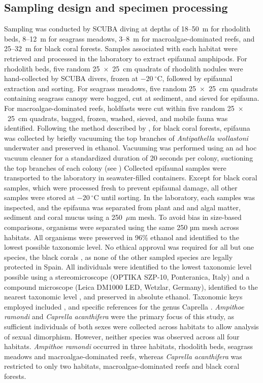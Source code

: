 \documentclass[journal,article,submit,pdftex,moreauthors]{Definitions/mdpi}
\begin{document}
    		\subsection{Sampling design and specimen processing}
    	Sampling was conducted by SCUBA diving at depths of 18–50~m for rhodolith beds, 8–12~m for seagrass meadows, 3–8~m for macroalgae-dominated reefs, and 25–32~m for black coral forests. Samples associated with each habitat were retrieved and processed in the laboratory to extract epifaunal amphipods. For rhodolith beds, five random 25~$\times$~25~cm quadrats of rhodolith nodules were hand-collected by SCUBA divers, frozen at $-20~^\circ$C, followed by epifaunal extraction and sorting. For seagrass meadows, five random 25~$\times$~25~cm  quadrats containing seagrass canopy were bagged, cut at sediment, and sieved for epifauna. For macroalgae-dominated reefs, holdfasts were cut within five random 25~$\times$~25~cm quadrats, bagged, frozen, washed, sieved, and mobile fauna was identified. Following the method described by \citep{navarro2024hidden}, for black coral forests, epifauna was collected by briefly vacuuming the top branches of \textit{Antipathella wollastoni} underwater and preserved in ethanol. Vacuuming was performed using an ad hoc vacuum cleaner for a standardized duration of 20 seconds per colony, suctioning the top branches of each colony (see \citet{navarro2024hidden}) Collected epifaunal samples were transported to the laboratory in seawater-filled containers. Except for black coral samples, which were processed fresh to prevent epifaunal damage, all other samples were stored at $-20~^\circ$C until sorting. In the laboratory, each samples was inspected, and the epifauna was separated from plant and and algal matter, sediment and coral mucus using a 250~$\mu$m mesh. To avoid bias in size-based comparisons, organisms were separated using the same 250 µm mesh across habitats. All organisms were preserved in 96\% ethanol and identified to the lowest possible taxonomic level. No ethical approval was required for all but one species, the black corals \citep{Wagner2012}, as none of the other sampled species are legally protected in Spain. All individuals were identified to the lowest taxonomic level possible using a stereomicroscope (OPTIKA SZP-10, Ponteranica, Italy) and a compound microscope (Leica DM1000 LED, Wetzlar, Germany), identified to the nearest taxonomic level \citep{bellan1982amphipoda, bellan1989amphipoda, bellan1993amphipoda}, and preserved in absolute ethanol. Taxonomic keys employed included \citet{ruffo1982family, ruffo1989amphipoda, bellan1993amphipoda, bellan1998amphipoda}, and specific references for the genus Caprella \citep{guerra2002caprellidea}. \textit{Ampithoe ramondi} and \textit{Caprella acanthifera} were the primary focus of this study, as sufficient individuals of both sexes were collected across habitats to allow analysis of sexual dimorphism. However, neither species was observed across all four habitats. \textit{Ampithoe ramondi} occurred in three habitats, rhodolith beds, seagrass meadows and macroalgae-dominated reefs, whereas \textit{Caprella acanthifera} was restricted to only two habitats, macroalgae-dominated reefs and black coral forests.
	
\end{document}
